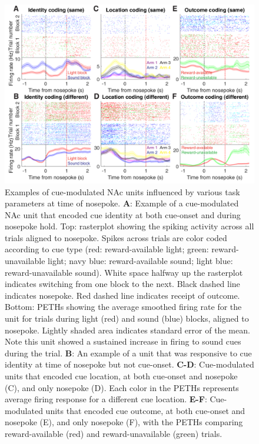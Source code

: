 \documentclass[11pt]{article}
\newcommand{\bsf}[1]{\textbf{#1}}
\begin{document}
 \begin{figure}[ht!]
\centering
\includegraphics[width=\textwidth]{Fig 7 - NP Neural examples.pdf}
\caption{Examples of cue-modulated NAc units influenced by various task
parameters at time of nosepoke. \bsf{A}: Example of a cue-modulated NAc unit
that encoded cue identity at both cue-onset and during nosepoke hold. Top:
rasterplot showing the spiking activity across all trials aligned to
nosepoke. Spikes across trials are color coded according to cue type (red:
reward-available light; green: reward-unavailable light; navy blue:
reward-available sound; light blue: reward-unavailable sound). White space
halfway up the rasterplot indicates switching from one block to the
next. Black dashed line indicates nosepoke. Red dashed line indicates receipt
of outcome. Bottom: PETHs showing the average smoothed firing rate for the
unit for trials during light (red) and sound (blue) blocks, aligned to
nosepoke. Lightly shaded area indicates standard error of the mean. Note this
unit showed a sustained increase in firing to sound cues during the trial. \bsf{B}: An
example of a unit that was responsive to cue identity at time of nosepoke but
not cue-onset. \bsf{C-D}: Cue-modulated units that encoded cue location, at
both cue-onset and nosepoke (C), and only nosepoke (D). Each color in the
PETHs represents average firing response for a different cue
location. \bsf{E-F}: Cue-modulated units that encoded cue outcome, at both
cue-onset and nosepoke (E), and only nosepoke (F), with the PETHs comparing
reward-available (red) and reward-unavailable (green) trials.}
\label{fig:NP_examples}
\end{figure} \clearpage
\end{document}
